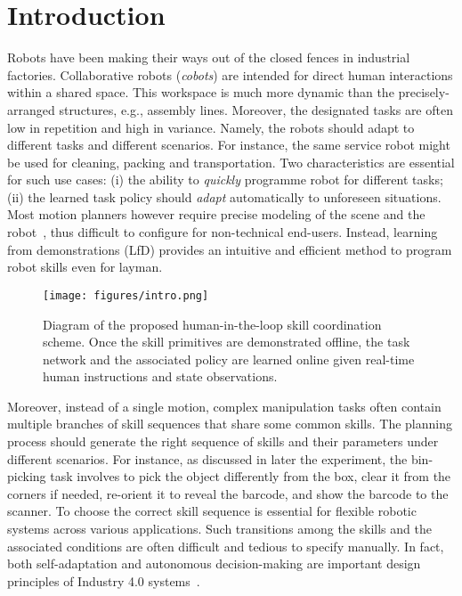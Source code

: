 \section{Introduction}\label{sec:introduction}
Robots have been making their ways out of the closed fences in industrial factories. 
Collaborative robots (\emph{cobots}) are intended for direct human interactions within a shared space.
This workspace is much more dynamic than the precisely-arranged structures, e.g., assembly lines.
Moreover, the designated tasks are often low in repetition and high in variance.
Namely, the robots should adapt to different tasks and different scenarios. 
For instance, 
the same service robot might be used for cleaning, packing and transportation. 
Two characteristics are essential for such use cases:
(i) the ability to \emph{quickly} programme robot for different tasks;
(ii) the learned task policy should \emph{adapt} automatically to unforeseen situations.
Most motion planners however require precise modeling of the scene and the robot~\cite{lavalle2006planning}, thus difficult to configure for non-technical end-users.
Instead, learning from demonstrations (LfD) provides an intuitive and efficient method to program robot skills even for layman.


\begin{figure}[t!]
    \centering
    \texttt{[image: figures/intro.png]}
    \caption{Diagram of the proposed human-in-the-loop skill coordination scheme. 
Once the skill primitives are demonstrated offline, 
the task network and the associated policy are learned online given real-time human instructions and state observations.}
    \label{fig:framework}
    \vspace{-0.15cm}
\end{figure}

Moreover, instead of a single motion, 
complex manipulation tasks often contain multiple branches of skill sequences that share some common skills.
The planning process should generate the right sequence of skills and their parameters under different scenarios. 
For instance, as discussed in later the experiment, 
the bin-picking task involves to pick the object differently from the box, clear it from the corners if needed, re-orient it to reveal the barcode, and show the barcode to the scanner. 
To choose the correct skill sequence is essential for flexible robotic systems across various applications.
Such transitions among the skills and the associated conditions are often difficult and tedious to specify manually.
In fact, both self-adaptation and autonomous decision-making are important design principles of Industry 4.0 systems~\cite{hermann2016design}.

